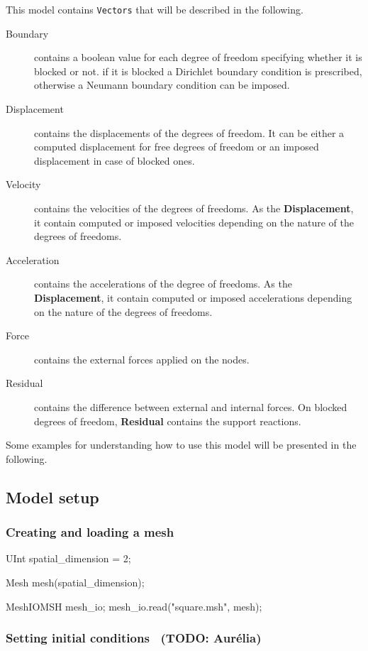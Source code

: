 \documentclass[a4paper,11pt]{book}
\newcommand{\code}[1]{\texttt{#1}}
\newcommand{\todo}[1]{~({\small\color{red}\textbf{TODO: }\textbf{#1}})}
\begin{document}
This model contains \code{Vectors} that will be described in the following.
\begin{description}
\item[Boundary] contains a  boolean value for each degree  of freedom specifying
  whether it is blocked or not.  if it is blocked a Dirichlet boundary condition
  is prescribed, otherwise a Neumann boundary condition can be imposed.
\item[Displacement] contains the displacements of the degrees of freedom. It can
  be either  a computed displacement for  free degrees of freedom  or an imposed
  displacement in case of blocked ones.
\item[Velocity]  contains the  velocities of  the  degrees of  freedoms. As  the
  \textbf{Displacement}, it contain computed  or imposed velocities depending on
  the nature of the degrees of freedoms.
\item[Acceleration] contains the accelerations of the degree of freedoms. As the
  \textbf{Displacement}, it contain  computed or imposed accelerations depending
  on the nature of the degrees of freedoms.
\item[Force] contains the external forces applied on the nodes.
\item[Residual] contains the difference between external and internal forces. On
  blocked degrees of freedom, \textbf{Residual} contains the support reactions.
\end{description}

Some examples for  understanding how to use this model will  be presented in the
following.

\subsection{Model setup}
\subsubsection{Creating and loading a mesh\label{sect:common:mesh}}

\begin{cpp}
  UInt spatial_dimension = 2;

  Mesh mesh(spatial_dimension);

  MeshIOMSH mesh_io;
  mesh_io.read("square.msh", mesh);
\end{cpp}

\subsubsection{Setting   initial  conditions  \label{sect:smm:initial_condition}
  \todo{Aur\'elia}}
\end{document}
